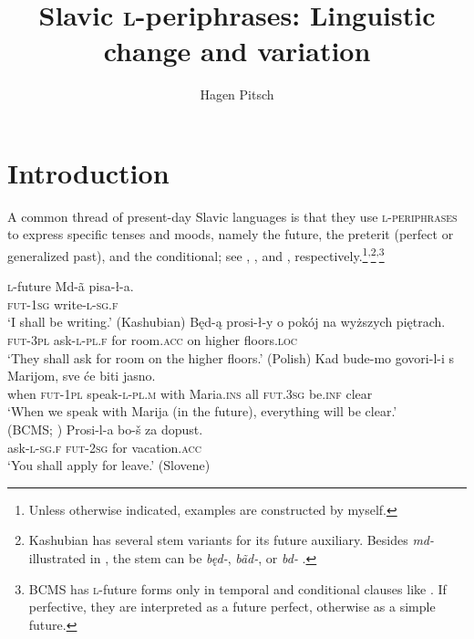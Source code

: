 \documentclass[output=paper]{langscibook}
\title[Slavic \textsc{l-}periphrases]{Slavic \textsc{l-}periphrases: Linguistic change and variation}
\author{Hagen Pitsch\affiliation{Georg-August-Universität Göttingen}}
\begin{document}
\maketitle

\section{Introduction}

A common thread of present-day Slavic languages is that they use \textsc{\textsc{l-}periphrases} to express specific tenses and moods, namely the future, the preterit (perfect or generalized past), and the conditional; see , , and , respectively.\footnote{Unless otherwise indicated, examples are constructed by myself.}\textsuperscript{,}\footnote{Kashubian has several stem variants for its future auxiliary. Besides \textit{md-} illustrated in , the stem can be \textit{będ-}, \textit{bãd-}, or \textit{bd-} \citep[see][776--777]{Stone1993}.}\textsuperscript{,}\footnote{BCMS has \textsc{l-}future forms only in temporal and conditional clauses like . If perfective, they are interpreted as a future perfect, otherwise as a simple future.}
    
\ea \textsc{l-}future
\ea\gll Md-ã pisa-ł-a.\\
\textsc{fut-1sg} write\textsc{-l-sg.f}\\ 
\glt `I shall be writing.' \hfill (Kashubian) \label{pitsch:ex:fut_Kashubian}
\ex\gll Będ-ą prosi-ł-y o pokój na {wyższych piętrach}.\\
\textsc{fut-3pl} ask\textsc{-l-pl.f} for room.\textsc{acc} on {higher floors.\textsc{loc}}\\
\glt `They shall ask for room on the higher floors.' \hfill (Polish)
\ex\gll Kad bude-mo govori-l-i s Marijom, sve će biti jasno.\\
when \textsc{fut-1pl} speak\textsc{-l-pl.m} with Maria.\textsc{ins} all \textsc{fut.3sg} be.\textsc{inf} clear\\ 
\glt `When we speak with Marija (in the future), everything will be clear.' \\ \hfill \hfill (BCMS; \citealt[331]{Browne1993}) \label{pitsch:ex:fut_BCMS}
\ex\gll Prosi-l-a bo-š za dopust.\\
ask\textsc{-l-sg.f} \textsc{fut-2sg} for vacation.\textsc{acc}\\ 
\glt `You shall apply for leave.' \hfill (Slovene)
\z \label{pitsch:ex:fut}
\z
    
\end{document}

